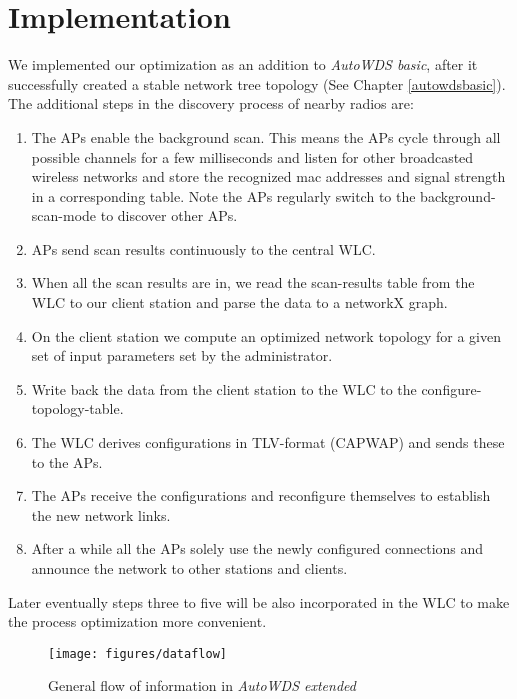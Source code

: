\chapter{Implementation}
  We implemented our optimization as an addition to \textit{AutoWDS basic}, after it successfully created a stable network tree topology (See Chapter \ref{autowdsbasic}).
  The additional steps in the discovery process of nearby radios are:
  
  \begin{enumerate}
   \item The APs enable the background scan. This means the APs cycle through all possible channels for a few milliseconds 
    and listen for other broadcasted wireless networks and store the recognized mac addresses and signal strength in a corresponding table.
    Note the APs regularly switch to the background-scan-mode to discover other APs.
   \item APs send scan results continuously to the central \ac{WLC}.
   \item When all the scan results are in, we read the scan-results table from the \ac{WLC} to our client station and parse the data to a networkX graph.
   \item On the client station we compute an optimized network topology for a given set of input parameters set by the administrator. 
   \item Write back the data from the client station to the WLC to the configure-topology-table.
   \item The \ac{WLC} derives configurations in \ac{TLV}-format (\ac{CAPWAP}) and sends these to the APs.
   \item The APs receive the configurations and reconfigure themselves to establish the new network links.
   \item After a while all the APs solely use the newly configured connections and announce the network to other stations and clients.
  \end{enumerate}
  
  Later eventually steps three to five will be also incorporated in the \ac{WLC} to make the process optimization more convenient.
  
  \begin{figure}[h!]
    \centering
    \texttt{[image: figures/dataflow]}
    \caption{General flow of information in \textit{AutoWDS extended}}
    \label{fig:dataflow}
  \end{figure}

